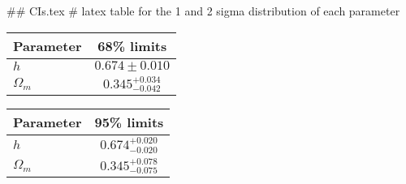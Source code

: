 ## CIs.tex
# latex table for the 1 and 2 sigma distribution of each parameter

\begin{tabular} { l  c}
 Parameter &  68\% limits\\
\hline
{\boldmath$h              $} & $0.674\pm 0.010            $\\
{\boldmath$\Omega_m       $} & $0.345^{+0.034}_{-0.042}   $\\
\hline
\end{tabular}

\begin{tabular} { l  c}
 Parameter &  95\% limits\\
\hline
{\boldmath$h              $} & $0.674^{+0.020}_{-0.020}   $\\
{\boldmath$\Omega_m       $} & $0.345^{+0.078}_{-0.075}   $\\
\hline
\end{tabular}
